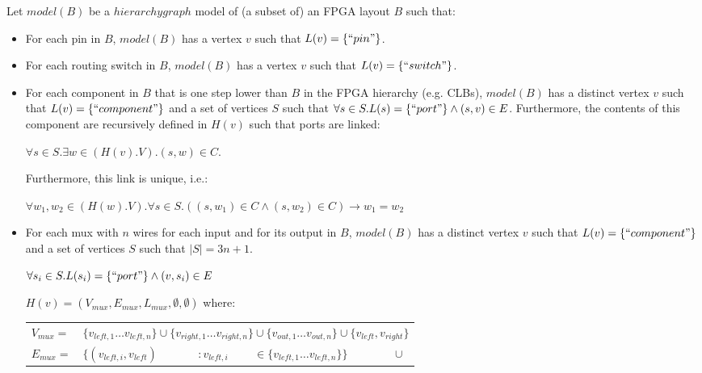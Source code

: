 \begin{defn}
Let $model(B)$ be a $hierarchygraph$ model of (a subset of) an FPGA layout $B$ such that:

\begin{itemize}
\item For each pin in $B$, $model(B)$ has a vertex $v$ such that $L(v)=\{``pin"\}$.

\item For each routing switch in $B$, $model(B)$ has a vertex $v$ such that $L(v)=\{``switch"\}$.

\item For each component in $B$ that is one step lower than $B$ in the FPGA hierarchy (e.g. CLBs), $model(B)$ has a distinct vertex $v$ such that $L(v)=\{``component"\}$ and a set of vertices $S$ such that $\forall s \in S . L(s) = \{``port"\} \land (s,v) \in E$. Furthermore, the contents of this component are recursively defined in $H(v)$ such that ports are linked:

 $\forall s \in S . \exists w \in (H(v).V) . (s, w) \in C$.
 
 Furthermore, this link is unique, i.e.:
 
 
  $\forall w_1, w_2 \in (H(w).V). \forall s \in S . ((s,w_1) \in C \land (s, w_2) \in C) \to w_1=w_2$

\item For each mux with $n$ wires for each input and for its output in $B$, $model(B)$ has a distinct vertex $v$ such that $L(v)=\{``component"\}$ and a set of vertices $S$ such that $|S|=3n+1$.


$\forall s_i \in S. L(s_i)=\{``port"\} \land (v, s_i) \in E$

$H(v) = (V_{mux}, E_{mux}, L_{mux}, \emptyset, \emptyset)$ where:

\begin{tabular}{lllll}
$V_{mux} = $ &  \multicolumn{4}{l}{$\{v_{left, 1} \dots v_{left, n}\} \cup \{v_{right, 1} \dots v_{right, n}\} \cup \{v_{out, 1} \dots v_{out, n}\} \cup \{v_{left}, v_{right}\}$}\\

$E_{mux} = $ & $\{(v_{left, i}, v_{left})$&$: v_{left, i}$&$\in \{v_{left, 1} \dots v_{left, n}\}\}$ & $\cup$\\


\end{tabular}
\end{itemize}
\end{defn}
